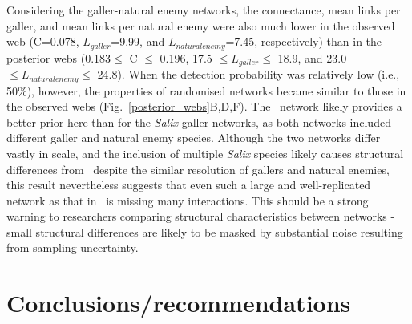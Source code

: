 \documentclass[12pt]{article}
\begin{document}
\begin{spacing}{2.0}
    Considering the galler-natural enemy networks, the connectance, mean links per galler, and mean links per natural enemy were also much lower in the observed web (C=0.078, $L_{galler}$=9.99, and $L_{natural enemy}$=7.45, respectively) than in the posterior webs (0.183$\leq$ C $\leq$ 0.196, 17.5 $\leq L_{galler} \leq$ 18.9, and 23.0 $\leq L_{natural enemy} \leq$ 24.8). When the detection probability was relatively low (i.e., 50\%), however, the properties of randomised networks became similar to those in the observed webs (Fig.~\ref{posterior_webs}B,D,F). The~\citet{Barbour2016} network likely provides a better prior here than for the \emph{Salix}-galler networks, as both networks included different galler and natural enemy species. Although the two networks differ vastly in scale, and the inclusion of multiple \emph{Salix} species likely causes structural differences from~\citet{Barbour2016} despite the similar resolution of gallers and natural enemies, this result nevertheless suggests that even such a large and well-replicated network as that in~\citet{Kopelke2017} is missing many interactions. This should be a strong warning to researchers comparing structural characteristics between networks - small structural differences are likely to be masked by substantial noise resulting from sampling uncertainty.




\section*{Conclusions/recommendations}


\end{spacing}
\end{document}
